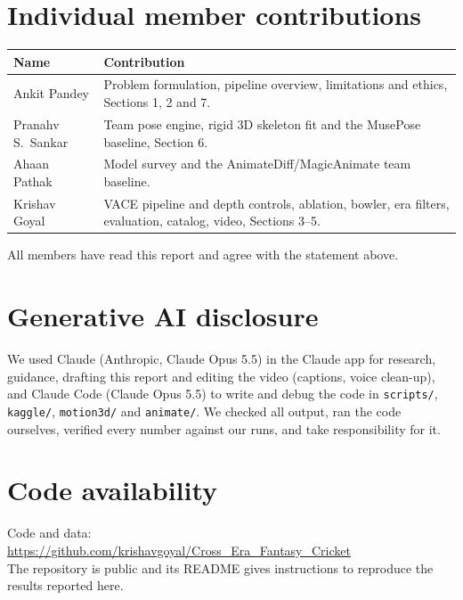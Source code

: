 \documentclass[11pt,a4paper,twocolumn]{article}
\newcommand{\githuburl}{https://github.com/krishavgoyal/Cross_Era_Fantasy_Cricket}
\begin{document}
\section*{Individual member contributions}
{\small
\begin{tabularx}{\linewidth}{@{}l X@{}}
\toprule
Name & Contribution \\
\midrule
Ankit Pandey & Problem formulation, pipeline overview, limitations and ethics, Sections 1, 2 and 7. \\
Pranahv S.\ Sankar & Team pose engine, rigid 3D skeleton fit and the MusePose baseline, Section 6. \\
Ahaan Pathak & Model survey and the AnimateDiff/MagicAnimate team baseline. \\
Krishav Goyal & VACE pipeline and depth controls, ablation, bowler, era filters, evaluation, catalog,
video, Sections 3--5. \\
\bottomrule
\end{tabularx}}

\smallskip
\noindent All members have read this report and agree with the statement above.

\section*{Generative AI disclosure}
We used Claude (Anthropic, Claude Opus 5.5) in the Claude app for research, guidance, drafting this report
and editing the video (captions, voice clean-up), and Claude Code (Claude Opus 5.5) to write and debug the
code in \texttt{scripts/}, \texttt{kaggle/}, \texttt{motion3d/} and \texttt{animate/}. We checked all output,
ran the code ourselves, verified every number against our runs, and take responsibility for it.

\section*{Code availability}
\noindent Code and data:\\
\url{\githuburl}\\
The repository is public and its README gives instructions to reproduce the results reported here.
\end{document}
